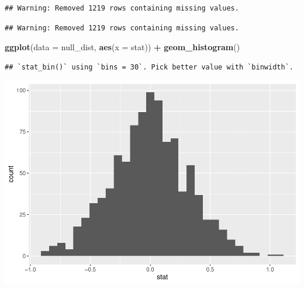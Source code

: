 \documentclass[
]{article}
\newenvironment{Shaded}{\begin{snugshade}}{\end{snugshade}}
\newcommand{\DataTypeTok}[1]{\textcolor[rgb]{0.13,0.29,0.53}{#1}}
\newcommand{\DecValTok}[1]{\textcolor[rgb]{0.00,0.00,0.81}{#1}}
\newcommand{\KeywordTok}[1]{\textcolor[rgb]{0.13,0.29,0.53}{\textbf{#1}}}
\newcommand{\NormalTok}[1]{#1}
\newcommand{\OperatorTok}[1]{\textcolor[rgb]{0.81,0.36,0.00}{\textbf{#1}}}
\newcommand{\StringTok}[1]{\textcolor[rgb]{0.31,0.60,0.02}{#1}}
\begin{document}
\begin{verbatim}
## Warning: Removed 1219 rows containing missing values.
\end{verbatim}

\begin{Shaded}
\end{Shaded}

\begin{verbatim}
## Warning: Removed 1219 rows containing missing values.
\end{verbatim}

\begin{Shaded}
\begin{Highlighting}[]
\KeywordTok{ggplot}\NormalTok{(}\DataTypeTok{data =}\NormalTok{ null_dist, }\KeywordTok{aes}\NormalTok{(}\DataTypeTok{x =}\NormalTok{ stat)) }\OperatorTok{+}
\StringTok{  }\KeywordTok{geom_histogram}\NormalTok{()}
\end{Highlighting}
\end{Shaded}

\begin{verbatim}
## `stat_bin()` using `bins = 30`. Pick better value with `binwidth`.
\end{verbatim}

\includegraphics{lab-7_files/figure-latex/unnamed-chunk-8-1.pdf}
\end{document}
